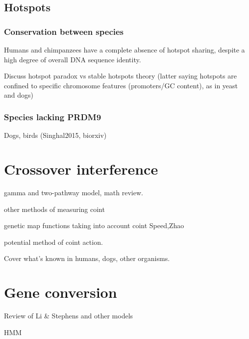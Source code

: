 \subsection{Hotspots}

\subsubsection{Conservation between species}
Humans and chimpanzees have a complete absence of hotspot sharing, despite a high degree of overall DNA sequence identity\cite{Ptak2005,Winckler2005,Auton2012a}.

Discuss hotspot paradox vs stable hotspots theory (latter saying hotspots are confined to specific chromosome features (promoters/GC content), as in yeast and dogs)
\subsubsection{Species lacking PRDM9}
Dogs, birds (Singhal2015, biorxiv) 


\section{Crossover interference}

\begin{titemize}
    \item gamma and two-pathway model, math review.
    \item other methods of measuring coint
    \item genetic map functions taking into account coint Speed,Zhao
    \item potential method of coint action.
    \item Cover what's known in humans, dogs, other organisms.
\end{titemize}

\section{Gene conversion}

\begin{titemize}
    \item Review of Li \& Stephens and other models
    \item HMM
\end{titemize}


